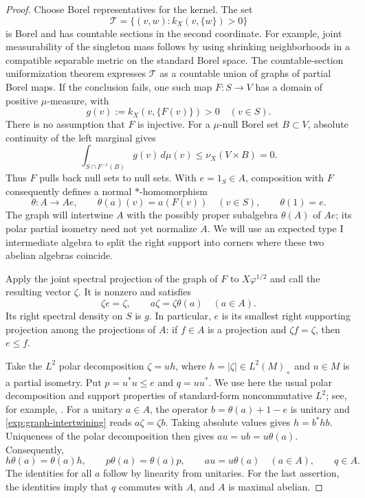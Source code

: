 \begin{proof}
Choose Borel representatives for the kernel.  The set
\[
 \mathcal T=\{(v,w):k_X(v,\{w\})>0\}
\]
is Borel and has countable sections in the second coordinate.  For example,
joint measurability of the singleton mass follows by using shrinking
neighborhoods in a compatible separable metric on the standard Borel
space.  The countable-section uniformization theorem expresses
$\mathcal T$ as a countable union of graphs of partial Borel maps.
If the conclusion fails, one such map $F:S\to V$ has a domain of positive
$\mu$-measure, with
\[
 g(v):=k_X(v,\{F(v)\})>0\quad(v\in S).
\]
There is no assumption that $F$ is injective.  For a $\mu$-null Borel set
$B\subset V$, absolute continuity of the left marginal gives
\[
 \int_{S\cap F^{-1}(B)}g(v)\,d\mu(v)
 \leq\nu_X(V\times B)=0.
\]
Thus $F$ pulls back null sets to null sets.  With $e=1_S\in A$, composition
with $F$ consequently defines a normal $*$-homomorphism
\[
 \theta:A\longrightarrow Ae,\qquad
 \theta(a)(v)=a(F(v))\quad(v\in S),\qquad \theta(1)=e.
\]
The graph will intertwine $A$ with the possibly proper subalgebra
$\theta(A)$ of $Ae$; its polar partial isometry need not yet normalize
$A$. We will use an expected type I intermediate algebra to split the
right support into corners where these two abelian algebras coincide.

Apply the joint spectral projection of the graph of $F$ to
$X\varphi^{1/2}$ and call the resulting vector $\zeta$.  It is nonzero and
satisfies
\begin{equation}\label{exp:graph-intertwining}
 \zeta e=\zeta,\qquad a\zeta=\zeta\theta(a)\quad(a\in A).
\end{equation}
Its right spectral density on $S$ is $g$.  In particular, $e$ is its
smallest right supporting projection among the projections of $A$:
if $f\in A$ is a projection and $\zeta f=\zeta$, then $e\leq f$.

Take the $L^2$ polar decomposition
$\zeta=u h$, where $h=|\zeta|\in L^2(M)_+$ and $u\in M$ is a partial
isometry.  Put $p=u^*u\leq e$ and $q=uu^*$.  We use here the usual
polar decomposition and support properties of standard-form
noncommutative $L^2$; see, for example, \cite[Lemma~11.12 and Theorem~11.30]{Hiai20}.
For a unitary $a\in A$, the operator $b=\theta(a)+1-e$ is unitary and
\eqref{exp:graph-intertwining} reads $a\zeta=\zeta b$.
Taking absolute values gives $h=b^*hb$.  Uniqueness of the polar
decomposition then gives $au=ub=u\theta(a)$.  Consequently,
\begin{equation}\label{exp:polar-intertwining}
 h\theta(a)=\theta(a)h,\qquad
 p\theta(a)=\theta(a)p,\qquad
 au=u\theta(a)\quad(a\in A),\qquad q\in A.
\end{equation}
The identities for all $a$ follow by linearity from unitaries.  For the
last assertion, the identities imply that $q$ commutes with $A$, and $A$
is maximal abelian.


\end{proof}

